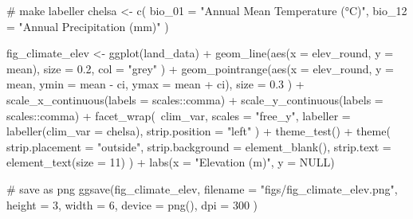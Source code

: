 \documentclass[]{article}
\newenvironment{Shaded}{}{}
\newcommand{\CommentTok}[1]{\textcolor[rgb]{0.00,0.50,0.00}{#1}}
\newcommand{\DataTypeTok}[1]{#1}
\newcommand{\DecValTok}[1]{#1}
\newcommand{\FloatTok}[1]{#1}
\newcommand{\KeywordTok}[1]{\textcolor[rgb]{0.00,0.00,1.00}{#1}}
\newcommand{\NormalTok}[1]{#1}
\newcommand{\OperatorTok}[1]{#1}
\newcommand{\OtherTok}[1]{\textcolor[rgb]{1.00,0.25,0.00}{#1}}
\newcommand{\StringTok}[1]{\textcolor[rgb]{0.00,0.50,0.50}{#1}}
\begin{document}
\begin{Shaded}
\begin{Highlighting}[]
\CommentTok{# make labeller}
\NormalTok{chelsa <-}\StringTok{ }\KeywordTok{c}\NormalTok{(}
  \DataTypeTok{bio_01 =} \StringTok{"Annual Mean Temperature (°C)"}\NormalTok{,}
  \DataTypeTok{bio_12 =} \StringTok{"Annual Precipitation (mm)"}
\NormalTok{)}

\NormalTok{fig_climate_elev <-}
\StringTok{  }\KeywordTok{ggplot}\NormalTok{(land_data) }\OperatorTok{+}
\StringTok{  }\KeywordTok{geom_line}\NormalTok{(}\KeywordTok{aes}\NormalTok{(}\DataTypeTok{x =}\NormalTok{ elev_round, }\DataTypeTok{y =}\NormalTok{ mean),}
    \DataTypeTok{size =} \FloatTok{0.2}\NormalTok{, }\DataTypeTok{col =} \StringTok{"grey"}
\NormalTok{  ) }\OperatorTok{+}
\StringTok{  }\KeywordTok{geom_pointrange}\NormalTok{(}\KeywordTok{aes}\NormalTok{(}\DataTypeTok{x =}\NormalTok{ elev_round, }\DataTypeTok{y =}\NormalTok{ mean, }\DataTypeTok{ymin =}\NormalTok{ mean }\OperatorTok{-}\StringTok{ }\NormalTok{ci, }\DataTypeTok{ymax =}\NormalTok{ mean }\OperatorTok{+}\StringTok{ }\NormalTok{ci),}
    \DataTypeTok{size =} \FloatTok{0.3}
\NormalTok{  ) }\OperatorTok{+}
\StringTok{  }\KeywordTok{scale_x_continuous}\NormalTok{(}\DataTypeTok{labels =}\NormalTok{ scales}\OperatorTok{::}\NormalTok{comma) }\OperatorTok{+}
\StringTok{  }\KeywordTok{scale_y_continuous}\NormalTok{(}\DataTypeTok{labels =}\NormalTok{ scales}\OperatorTok{::}\NormalTok{comma) }\OperatorTok{+}
\StringTok{  }\KeywordTok{facet_wrap}\NormalTok{(}\OperatorTok{~}\NormalTok{clim_var,}
    \DataTypeTok{scales =} \StringTok{"free_y"}\NormalTok{,}
    \DataTypeTok{labeller =} \KeywordTok{labeller}\NormalTok{(}\DataTypeTok{clim_var =}\NormalTok{ chelsa),}
    \DataTypeTok{strip.position =} \StringTok{"left"}
\NormalTok{  ) }\OperatorTok{+}
\StringTok{  }\KeywordTok{theme_test}\NormalTok{() }\OperatorTok{+}
\StringTok{  }\KeywordTok{theme}\NormalTok{(}
    \DataTypeTok{strip.placement =} \StringTok{"outside"}\NormalTok{,}
    \DataTypeTok{strip.background =} \KeywordTok{element_blank}\NormalTok{(),}
    \DataTypeTok{strip.text =} \KeywordTok{element_text}\NormalTok{(}\DataTypeTok{size =} \DecValTok{11}\NormalTok{)}
\NormalTok{  ) }\OperatorTok{+}
\StringTok{  }\KeywordTok{labs}\NormalTok{(}\DataTypeTok{x =} \StringTok{"Elevation (m)"}\NormalTok{, }\DataTypeTok{y =} \OtherTok{NULL}\NormalTok{)}

\CommentTok{# save as png}
\KeywordTok{ggsave}\NormalTok{(fig_climate_elev,}
  \DataTypeTok{filename =} \StringTok{"figs/fig_climate_elev.png"}\NormalTok{,}
  \DataTypeTok{height =} \DecValTok{3}\NormalTok{, }\DataTypeTok{width =} \DecValTok{6}\NormalTok{, }\DataTypeTok{device =} \KeywordTok{png}\NormalTok{(), }\DataTypeTok{dpi =} \DecValTok{300}
\NormalTok{)}
\end{Highlighting}
\end{Shaded}
\end{document}
